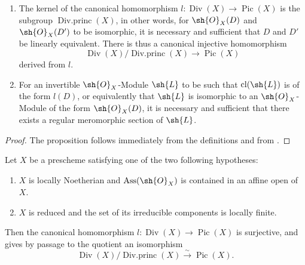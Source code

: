 \begin{proposition}[21.3.3]
\label{IV.21.3.3}
\begin{enumerate}[label=(\roman*)]
  \item The kernel of the canonical homomorphism $l:\operatorname{Div}(X)\to\operatorname{Pic}(X)$ is the subgroup $\operatorname{Div.princ}(X)$, in other words, for $\sh{O}_X(D)$ and $\sh{O}_X(D')$ to be isomorphic, it is necessary and sufficient that $D$ and $D'$ be linearly equivalent.
  There is thus a canonical injective homomorphism
\[
\label{IV.21.3.3.1}
  \operatorname{Div}(X)/\operatorname{Div.princ}(X)\to\operatorname{Pic}(X)
  \tag{21.3.3.1}
\]
  derived from $l$.
  \item For an invertible $\sh{O}_X$-Module $\sh{L}$ to be such that $\operatorname{cl}(\sh{L})$ is of the form $l(D)$, or equivalently that $\sh{L}$ is isomorphic to an $\sh{O}_X$-Module of the form $\sh{O}_X(D)$, it is necessary and sufficient that there exists a regular meromorphic section of $\sh{L}$.
\end{enumerate}
\end{proposition}

\begin{proof}
The proposition follows immediately from the definitions and from .
\end{proof}

\begin{proposition}[21.3.4]
\label{IV.21.3.4}
Let $X$ be a prescheme satisfying one of the two following hypotheses:
\begin{enumerate}[label=\emph{\alph*)}]
  \item $X$ is locally Noetherian and $\operatorname{Ass}(\sh{O}_X)$ is contained in an affine open of $X$.
  \item $X$ is reduced and the set of its irreducible components is locally finite.
\end{enumerate}
Then the canonical homomorphism $l:\operatorname{Div}(X)\to\operatorname{Pic}(X)$ is surjective, and gives by passage to the quotient an isomorphism
\[
  \operatorname{Div}(X)/\operatorname{Div.princ}(X)\xrightarrow{\sim}\operatorname{Pic}(X).
\]
\end{proposition}

